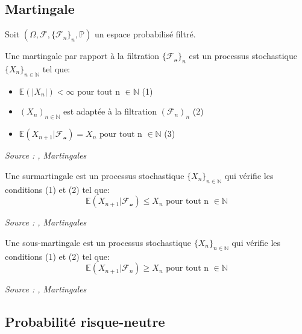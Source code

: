 \subsection{Martingale}

Soit $(\Omega, \mathcal{F}, \{\mathcal{F}_n\}_n, \mathbb{P})$ un espace probabilisé filtré.


\begin{definition}\label{def:martingale}

Une martingale par rapport à la filtration $\{\mathcal{F_n}\}_n$ est un processus stochastique $\{X_n\}_{n \in \mathbb{N}}$ tel que:
    \begin {itemize}
        \item $\mathbb{E}(|X_n|) < \infty \text{ pour tout n } \in \mathbb{N}$ (1)
    	\item $(X_n)_{n \in \mathbb{N}}$ est adaptée à la filtration
    		$(\mathcal{F}_n)_n$ (2)
        \item $\mathbb{E}(X_{n+1}|\mathcal{F_n}) = X_n \text{ pour tout n } \in \mathbb{N}$ (3)
    \end {itemize}

\noindent\textit{Source : \cite{martingale_calcul_stochastique},  Martingales}
\end{definition}

\begin{definition}\label{def:sur_martingale}
Une surmartingale est un processus stochastique $\{X_n\}_{n \in \mathbb{N}}$ qui vérifie les conditions (1) et (2) tel que:
$$\mathbb{E}(X_{n+1}|\mathcal{F_n}) \le X_n \text{ pour tout n } \in \mathbb{N}$$

\noindent\textit{Source : \cite{martingale_calcul_stochastique},  Martingales}
\end{definition}

\begin{definition}\label{def:sous_martingale}
Une sous-martingale est un processus stochastique $\{X_n\}_{n \in \mathbb{N}}$ qui vérifie les conditions (1) et (2) tel que:
$$\mathbb{E}(X_{n+1}|\mathcal{F}_n) \ge X_n \text{ pour tout n } \in \mathbb{N}$$

\noindent\textit{Source : \cite{martingale_calcul_stochastique},  Martingales}
\end{definition}


\subsection{Probabilité risque-neutre}

